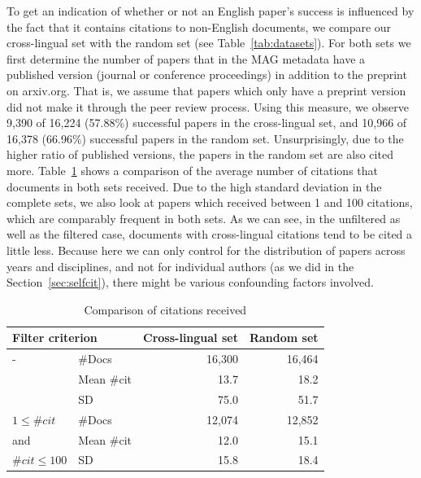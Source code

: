 To get an indication of whether or not an English paper's success is influenced by the fact that it contains citations to non-English documents, we compare our cross-lingual set with the random set (see Table~\ref{tab:datasets}). For both sets we first determine the number of papers that in the MAG metadata have a published version (journal or conference proceedings) in addition to the preprint on arxiv.org. That is, we assume that papers which only have a preprint version did not make it through the peer review process. Using this measure, we observe 9,390 of 16,224 (57.88\%) successful papers in the cross-lingual set, and 10,966 of 16,378 (66.96\%) successful papers in the random set. Unsurprisingly, due to the higher ratio of published versions, the papers in the random set are also cited more. Table~\ref{tab:citcounts} shows a comparison of the average number of citations that documents in both sets received. Due to the high standard deviation in the complete sets, we also look at papers which received between 1 and 100 citations, which are comparably frequent in both sets. As we can see, in the unfiltered as well as the filtered case, documents with cross-lingual citations tend to be cited a little less. Because here we can only control for the distribution of papers across years and disciplines, and not for individual authors (as we did in the Section~\ref{sec:selfcit}), there might be various confounding factors involved.


\begin{table}[tb]
\caption{Comparison of citations received}
 \label{tab:citcounts}
  \centering
  \begin{small}
 \begin{threeparttable}
 \begin{tabular}{llrr}
 \toprule
   \multicolumn{2}{l}{Filter criterion} & Cross-lingual set & Random set \\
   \midrule
   - & \#Docs & 16,300 & 16,464 \\
   \ & Mean \#cit & 13.7 & 18.2 \\
   \ & SD & 75.0 & 51.7 \\
   \midrule
   $1\le \#cit$ & \#Docs & 12,074 & 12,852 \\
   and & Mean \#cit & 12.0 & 15.1 \\
   $\#cit\le 100$ & SD & 15.8 & 18.4 \\
   \bottomrule
 \end{tabular}
\end{threeparttable}
  \end{small}
\end{table}

